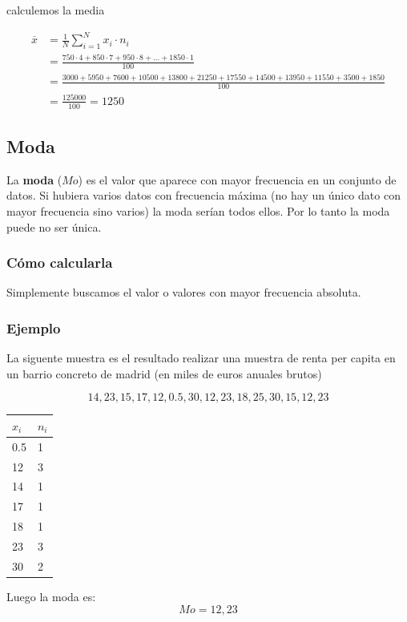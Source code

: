 \documentclass[
]{article}
\begin{document}
calculemos la media

\begin{align*}
\overline x &= \frac{1}{N}\sum^{N}_{i=1} x_i  \cdot n_i\\
&= \frac{750  \cdot  4 + 850  \cdot  7 + 950 \cdot 8 +  \ldots + 1850 \cdot  1}{100}\\
& = \frac{3000  + 5950  + 7600  + 10500 + 13800 + 21250 + 17550 + 14500 + 13950 + 11550 + 3500  + 1850}{100}\\
&=\frac{125000}{100}=1250
\end{align*}

\hypertarget{moda}{%
\subsection{Moda}\label{moda}}

La \textbf{moda} (\(Mo\)) es el valor que aparece con mayor frecuencia
en un conjunto de datos. Si hubiera varios datos con frecuencia máxima
(no hay un único dato con mayor frecuencia sino varios) la moda serían
todos ellos. Por lo tanto la moda puede no ser única.

\hypertarget{cuxf3mo-calcularla-1}{%
\subsubsection{Cómo calcularla}\label{cuxf3mo-calcularla-1}}

Simplemente buscamos el valor o valores con mayor frecuencia absoluta.

\hypertarget{ejemplo-2}{%
\subsubsection{Ejemplo}\label{ejemplo-2}}

La siguente muestra es el resultado realizar una muestra de renta per
capita en un barrio concreto de madrid (en miles de euros anuales
brutos)

\[ 14, 23, 15, 17,12, 0.5, 30, 12, 23, 18, 25, 30, 15, 12, 23 \]

\begin{longtable}[]{@{}ll@{}}
\toprule
\(x_i\) & \(n_i\)\tabularnewline
\midrule
\endhead
0.5 & 1\tabularnewline
12 & 3\tabularnewline
14 & 1\tabularnewline
17 & 1\tabularnewline
18 & 1\tabularnewline
23 & 3\tabularnewline
30 & 2\tabularnewline
\bottomrule
\end{longtable}

Luego la moda es: \[Mo = 12, 23\]
\end{document}
